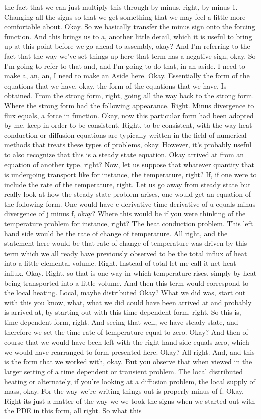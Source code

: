 \documentclass[10pt]{article}
\begin{document}
the fact that we can just multiply this through by minus, right, by minus 1. Changing all the signs so that we get something that we may feel a little more comfortable about. Okay. So we basically transfer the minus sign onto the forcing function. And this brings us to a, another little detail, which it is useful to bring up at this point before we go ahead to assembly, okay? And I'm referring to the fact that the way we've set things up here that term has a negative sign, okay. So I'm going to refer to that and, and I'm going to do that, in an aside. I need to make a, an, an, I need to make an Aside here. Okay. Essentially the form of the equations that we have, okay, the form of the equations that we have. Is obtained. From the strong form, right, going all the way back to the strong form. Where the strong form had the following appearance. Right. Minus divergence to flux equals, a force in function. Okay, now this particular form had been adopted by me, keep in order to be consistent. Right, to be consistent, with the way heat conduction or diffusion equations are typically written in the field of numerical methods that treats these types of problems, okay. However, it's probably useful to also recognize that this is a steady state equation. Okay arrived at from an equation of another type, right? Now, let us suppose that whatever quantity that is undergoing transport like for instance, the temperature, right? If, if one were to include the rate of the temperature, right. Let us go away from steady state but really look at how the steady state problem arises, one would get an equation of the following form. One would have c derivative time derivative of u equals minus divergence of j minus f, okay? Where this would be if you were thinking of the temperature problem for instance, right? The heat conduction problem. This left hand side would be the rate of change of temperature. All right, and the statement here would be that rate of change of temperature was driven by this term which we all ready have previously observed to be the total influx of heat into a little elemental volume. Right. Instead of total let me call it net heat influx. Okay. Right, so that is one way in which temperature rises, simply by heat being transported into a little volume. And then this term would correspond to the local heating. Local, maybe distributed Okay? What we did was, start out with this you know, what, what we did could have been arrived at and probably is arrived at, by starting out with this time dependent form, right. So this is, time dependent form, right. And seeing that well, we have steady state, and therefore we set the time rate of temperature equal to zero. Okay? And then of course that we would have been left with the right hand side equals zero, which we would have rearranged to form presented here. Okay? All right. And, and this is the form that we worked with, okay. But you observe that when viewed in the larger setting of a time dependent or transient problem. The local distributed heating or alternately, if you're looking at a diffusion problem, the local supply of mass, okay. For the way we're writing things out is properly minus of f. Okay. Right its just a matter of the way we we took the signs when we started out with the PDE in this form, all right. So what this 
\end{document}
